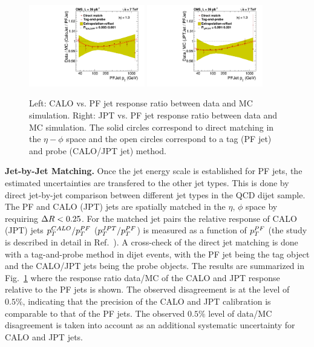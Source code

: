 \begin{figure}[ht!]
  \begin{center}
    \includegraphics[width=0.45\textwidth]{Figures/JEC/jetmatch013_calopf.pdf}
    \includegraphics[width=0.45\textwidth]{Figures/JEC/jetmatch013_jptpf.pdf}
    \caption{Left: CALO vs. PF jet \pt response ratio between data and MC simulation. Right: JPT vs. PF jet \pt response ratio between data and MC simulation. The solid circles correspond to direct matching in the $\eta-\phi$ space and the open circles correspond to a tag (PF jet) and probe (CALO/JPT jet) method.}
    \label{fig:caloVsPF}
  \end{center}
\end{figure}

{\bf Jet-by-Jet Matching.} Once the jet energy scale is established for PF jets, the estimated uncertainties are transfered to the other jet types. This is done by direct jet-by-jet comparison between different jet types in the QCD dijet sample. The PF and CALO (JPT) jets are spatially matched in the $\eta,\,\phi$ space by requiring $\Delta R<0.25$. For the matched jet pairs the relative response of CALO (JPT) jets $p_{{T}}^{CALO}/p_{{T}}^{PF}$ ($p_{{T}}^{JPT}/p_{{T}}^{PF}$) is measured as a function of $p_{{T}}^{PF}$ (the study is described in detail in Ref.~\cite{JME-10-003}). A cross-check of the direct jet matching is done with a tag-and-probe method in dijet events, with the PF jet being the tag object and the CALO/JPT jets being the probe objects. The results are summarized in Fig.~\ref{fig:caloVsPF} where the response ratio data/MC of the CALO and JPT response relative to the PF jets is shown. The observed disagreement is at the level of $0.5\%$, indicating that the precision of the CALO and JPT calibration is comparable to that of the PF jets. The observed $0.5\%$ level of data/MC disagreement is taken into account as an additional systematic uncertainty for CALO and JPT jets.

